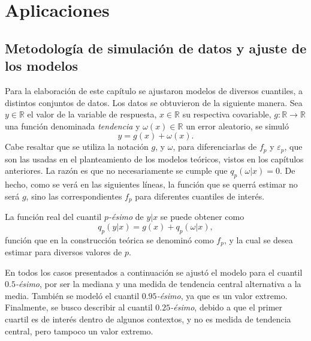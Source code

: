 \chapter[Aplicaciones]{Aplicaciones}

\section{Metodolog\'ia de simulaci\'on de datos y ajuste de los modelos}

Para la elaboraci\'on de este cap\'itulo se ajustaron modelos de diversos cuantiles, a distintos conjuntos de datos. Los datos se obtuvieron de la siguiente manera. Sea $y \in \mathbb{R}$ el valor de la variable de respuesta, $x \in \mathbb{R}$ su respectiva covariable, $g: \mathbb{R} \rightarrow \mathbb{R}$ una funci\'on denominada \textit{tendencia} y $\omega(x) \in \mathbb{R}$ un error aleatorio, se simul\'o
\begin{equation*}
    y = g(x) + \omega(x).
\end{equation*}
Cabe resaltar que se utiliza la notaci\'on $g$, y $\omega$, para diferenciarlas de $f_p$ y $\varepsilon_p$, que son las usadas en el planteamiento de los modelos te\'oricos, vistos en los cap\'itulos anteriores. La raz\'on es que no necesariamente se cumple que $q_p(\omega|x) = 0$. De hecho, como se ver\'a en las siguientes l\'ineas, la funci\'on que se querr\'a estimar no ser\'a $g$, sino las correspondientes $f_p$ para diferentes cuantiles de inter\'es.

La funci\'on real del cuantil $p$\textit{-\'esimo} de $y|x$ se puede obtener como
\begin{equation*}
    q_p(y|x) = g(x) + q_p(\omega|x),
\end{equation*}
funci\'on que en la construcci\'on te\'orica se denomin\'o como $f_p$, y la cual se desea estimar para diversos valores de $p$.

En todos los casos presentados a continuaci\'on se ajust\'o el modelo para el cuantil $0.5$\textit{-\'esimo}, por ser la mediana y una medida de tendencia central alternativa a la media. Tambi\'en se model\'o el cuantil $0.95$\textit{-\'esimo}, ya que es un valor extremo. Finalmente, se busco describir al cuantil $0.25$\textit{-\'esimo}, debido a que el primer cuartil es de inter\'es dentro de algunos contextos, y no es medida de tendencia central, pero tampoco un valor extremo.


